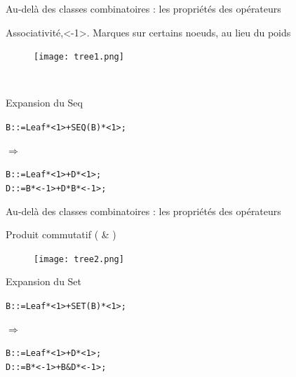 \documentclass{beamer}
\begin{document}
\begin{frame}{Au-delà des classes combinatoires : les propriétés des opérateurs}


\begin{block}{Associativité,<-1>. Marques sur certains noeuds, au lieu du poids}
\begin{figure}[h]
  \centering
  \texttt{[image: tree1.png]}
\end{figure}
\
\end{block}
\begin{block}{Expansion du Seq}
\begin{alltt}
B ::= Leaf * <1> + SEQ(B) * <1> ; \\
\end{alltt}
$\Rightarrow$
\begin{minipage}{0.7\textwidth}
\begin{alltt}
B ::= Leaf * <1> + D * <1>; \\
D ::= B * <-1> + D * B * <-1>;
\end{alltt}
\end{minipage}
\end{block}

\end{frame}



\begin{frame}[fragile]{Au-delà des classes combinatoires : les propriétés des opérateurs}


\begin{block}{Produit commutatif ( \& )}
\begin{figure}[h]
  \centering
  \texttt{[image: tree2.png]}
\end{figure}
\end{block}
\begin{block}{Expansion du Set}
\begin{alltt}
B ::= Leaf * <1> + SET(B) * <1> ;
\end{alltt}
$\Rightarrow$
\begin{minipage}{0.7\textwidth}
\begin{alltt}
B ::= Leaf * <1> + D * <1>; \\
D ::= B * <-1> + B \& D * <-1>;
\end{alltt}
\end{minipage}
\end{block}
\end{frame}
\end{document}
